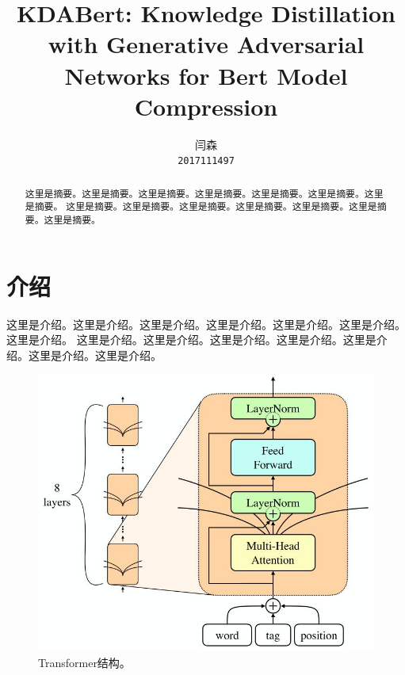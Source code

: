 \documentclass[11pt,a4paper]{article}
\title{KDABert: Knowledge Distillation with Generative Adversarial Networks for Bert Model Compression}
\author{闫森\\
  \texttt{2017111497} \\}
\date{}
\begin{document}
\maketitle
\begin{abstract}
    这里是摘要。这里是摘要。这里是摘要。这里是摘要。这里是摘要。这里是摘要。这里是摘要。
    这里是摘要。这里是摘要。这里是摘要。这里是摘要。这里是摘要。这里是摘要。这里是摘要。
\end{abstract}

\section{介绍}
\label{Sec:Introduction}
这里是介绍。这里是介绍。这里是介绍。这里是介绍。这里是介绍。这里是介绍。这里是介绍。
这里是介绍。这里是介绍。这里是介绍。这里是介绍。这里是介绍。这里是介绍。这里是介绍。

\begin{figure}[htbp]
    \centering
    \includegraphics[width=\linewidth]{images/multi_headed_attention.jpg}
    \caption{Transformer结构。}
    \label{Fig:multi_headed_attention}
\end{figure}
\end{document}
